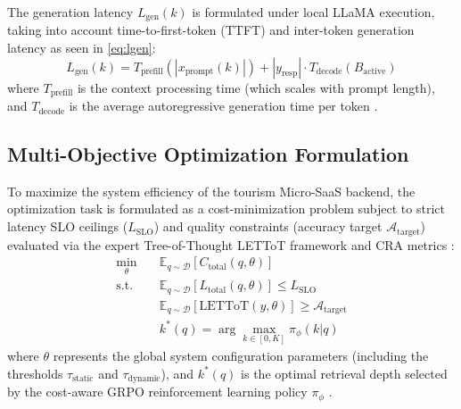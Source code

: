 \documentclass{ieeeaccess}
\begin{document}
The generation latency $L_{\text{gen}}(k)$ is formulated under local LLaMA execution, taking into account time-to-first-token (TTFT) and inter-token generation latency as seen in \eqref{eq:lgen}:
\begin{equation}
\label{eq:lgen}
    L_{\text{gen}}(k) = T_{\text{prefill}}(|x_{\text{prompt}}(k)|) + |y_{\text{resp}}| \cdot T_{\text{decode}}(B_{\text{active}})
\end{equation}
where $T_{\text{prefill}}$ is the context processing time (which scales with prompt length), and $T_{\text{decode}}$ is the average autoregressive generation time per token \cite{memboost-2025}.

\subsection{Multi-Objective Optimization Formulation}
To maximize the system efficiency of the tourism Micro-SaaS backend, the optimization task is formulated as a cost-minimization problem subject to strict latency SLO ceilings ($L_{\text{SLO}}$) and quality constraints (accuracy target $\mathcal{A}_{\text{target}}$) evaluated via the expert Tree-of-Thought LETToT framework \cite{qi-lettot-2025} and CRA metrics \cite{tourllm-2024}:
\begin{align}
    \min_{\theta} \quad & \mathbb{E}_{q \sim \mathcal{D}} \left[ C_{\text{total}}(q, \theta) \right] \\
    \text{s.t.} \quad & \mathbb{E}_{q \sim \mathcal{D}} \left[ L_{\text{total}}(q, \theta) \right] \le L_{\text{SLO}} \\
    & \mathbb{E}_{q \sim \mathcal{D}} \left[ \text{LETToT}(y, \theta) \right] \ge \mathcal{A}_{\text{target}} \\
    & k^*(q) = \arg\max_{k \in [0, K]} \pi_{\phi}(k | q)
\end{align}
where $\theta$ represents the global system configuration parameters (including the thresholds $\tau_{\text{static}}$ and $\tau_{\text{dynamic}}$), and $k^*(q)$ is the optimal retrieval depth selected by the cost-aware GRPO reinforcement learning policy $\pi_{\phi}$ \cite{hashemi-cost-aware-2025}. 
\end{document}
